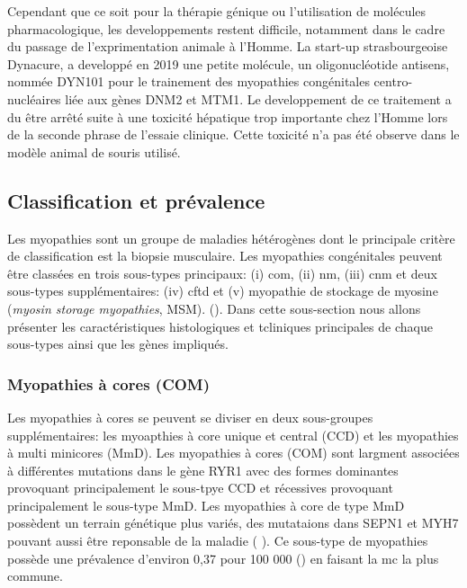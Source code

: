 Cependant que ce soit pour la thérapie génique ou l'utilisation de molécules pharmacologique, les developpements restent difficile, notamment dans le cadre du passage de l'exprimentation animale à l'Homme. La start-up strasbourgeoise Dynacure, a developpé en 2019 une petite molécule, un oligonucléotide antisens, nommée DYN101 pour le trainement des myopathies congénitales centro-nucléaires liée aux gènes DNM2 et MTM1. Le developpement de ce traitement a du être arrêté suite à une toxicité hépatique trop importante chez l'Homme lors de la seconde phrase de l'essaie clinique. Cette toxicité n'a pas été observe dans le modèle animal de souris utilisé.

\subsection{Classification et prévalence}
Les myopathies sont un groupe de maladies hétérogènes dont le principale critère de classification est la biopsie musculaire. Les myopathies congénitales peuvent être classées en trois sous-types principaux: (i) \gls{com}, (ii) \gls{nm}, (iii) \gls{cnm} et deux sous-types supplémentaires:  (iv) \gls{cftd} et (v) myopathie de stockage de myosine (\textit{myosin storage myopathies}, MSM). (\cite{cassandrini_congenital_2017, claeys_congenital_2020, north_approach_2014}). Dans cette sous-section nous allons présenter les caractéristiques histologiques et tcliniques principales de chaque sous-types ainsi que les gènes impliqués. 

\subsubsection{Myopathies à cores (COM)}
Les myopathies à cores se peuvent se diviser en deux sous-groupes supplémentaires: les myoapthies à core unique et central (CCD) et les myopathies à multi minicores (MmD). Les myopathies à cores (COM) sont largment associées à différentes mutations dans le gène RYR1 avec des formes dominantes provoquant principalement le sous-tpye CCD et récessives provoquant principalement le sous-type MmD. Les myopathies à core de type MmD possèdent un terrain génétique plus variés, des mutataions dans SEPN1 et MYH7 pouvant aussi être reponsable de la maladie (\cite{cassandrini_congenital_2017} ). Ce sous-type de myopathies possède une prévalence d'environ 0,37 pour 100 000 (\cite{huang_systematic_2021}) en faisant la \gls{mc} la plus commune. 


